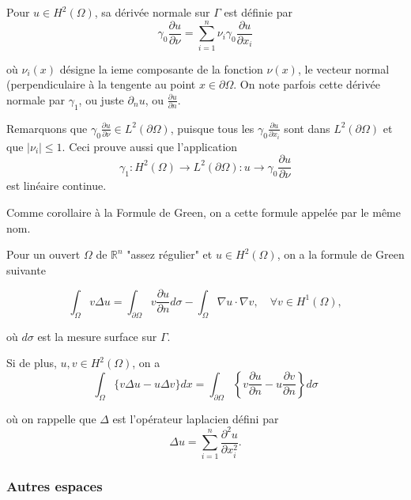 \begin{definition}
	
Pour $u \in H^{2}(\Omega)$, sa dérivée normale sur $\Gamma$ est définie par
$$
\gamma_{0} \frac{\partial u}{\partial \nu}=\sum_{i=1}^{n} \nu_{i} \gamma_{0} \frac{\partial u}{\partial x_{i}}
$$

où $\nu_{i}(x)$ désigne la ieme composante de la fonction $\nu(x)$,  le vecteur normal (perpendiculaire à la tengente au point $x\in \partial \Omega$. On note parfois cette dérivée normale par  $\gamma_1$, ou juste $\partial_n u$, ou $\frac{\partial u}{\partial n}$. 

\end{definition}


Remarquons que $\gamma_{0} \frac{\partial u}{\partial \nu} \in L^{2}(\partial \Omega)$, puisque tous les $\gamma_{0} \frac{\partial u}{\partial x_{i}}$ sont dans $L^{2}(\partial \Omega)$ et que $\left|\nu_{i}\right| \leqslant 1 .$ Ceci prouve aussi que l'application
$$
\gamma_{1} : H^{2}(\Omega) \rightarrow L^{2}(\partial \Omega): u \rightarrow \gamma_{0} \frac{\partial u}{\partial \nu}
$$
est linéaire continue.

Comme corollaire à la Formule de Green, on a cette formule appelée par le même nom.


\begin{corollary}
	
	
	
	
Pour un ouvert $\Omega$ de $\mathbb{R}^n$ "assez régulier"  et 	  $u\in H^2(\Omega)$, on a la formule de Green suivante 

	
$$\int_{\Omega} v\Delta u=\int_{\partial \Omega} v\frac{\partial u}{\partial n}  d \sigma-\int_{\Omega} \nabla u \cdot \nabla v, \quad \forall v \in H^{1}(\Omega),
$$
\end{corollary}

où  $d \sigma$ est la mesure surface sur  $\Gamma$. 

Si de plus, $u, v \in H^{2}(\Omega)$, on a
$$
\int_{\Omega}\{v\Delta u -u \Delta v\} d x=\int_{\partial \Omega}\left\{ v\frac{\partial u}{\partial n}  - u \frac{\partial v}{\partial n}\right\} d \sigma
$$

où on rappelle que $\Delta$ est l'opérateur laplacien défini par
$$
\Delta u=\sum_{i=1}^{n} \frac{\partial^{2} u}{\partial x_{i}^{2}}.
$$

\subsubsection{Autres espaces}

